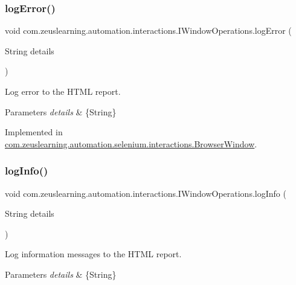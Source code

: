 \subsubsection{\texorpdfstring{log\+Error()}{logError()}}
{\footnotesize\ttfamily void com.\+zeuslearning.\+automation.\+interactions.\+I\+Window\+Operations.\+log\+Error (\begin{DoxyParamCaption}\item[{String}]{details }\end{DoxyParamCaption})}

Log error to the H\+T\+ML report.


\begin{DoxyParams}{Parameters}
{\em details} & \{String\} \\
\hline
\end{DoxyParams}


Implemented in \hyperlink{classcom_1_1zeuslearning_1_1automation_1_1selenium_1_1interactions_1_1BrowserWindow_a27fd367a5ca47cd73865863373b608e8}{com.\+zeuslearning.\+automation.\+selenium.\+interactions.\+Browser\+Window}.

\hypertarget{interfacecom_1_1zeuslearning_1_1automation_1_1interactions_1_1IWindowOperations_ab8dcfa34ce29883587eed3fcc9ca83fd}{}\label{interfacecom_1_1zeuslearning_1_1automation_1_1interactions_1_1IWindowOperations_ab8dcfa34ce29883587eed3fcc9ca83fd} 
\subsubsection{\texorpdfstring{log\+Info()}{logInfo()}}
{\footnotesize\ttfamily void com.\+zeuslearning.\+automation.\+interactions.\+I\+Window\+Operations.\+log\+Info (\begin{DoxyParamCaption}\item[{String}]{details }\end{DoxyParamCaption})}

Log information messages to the H\+T\+ML report.


\begin{DoxyParams}{Parameters}
{\em details} & \{String\} \\
\hline
\end{DoxyParams}


